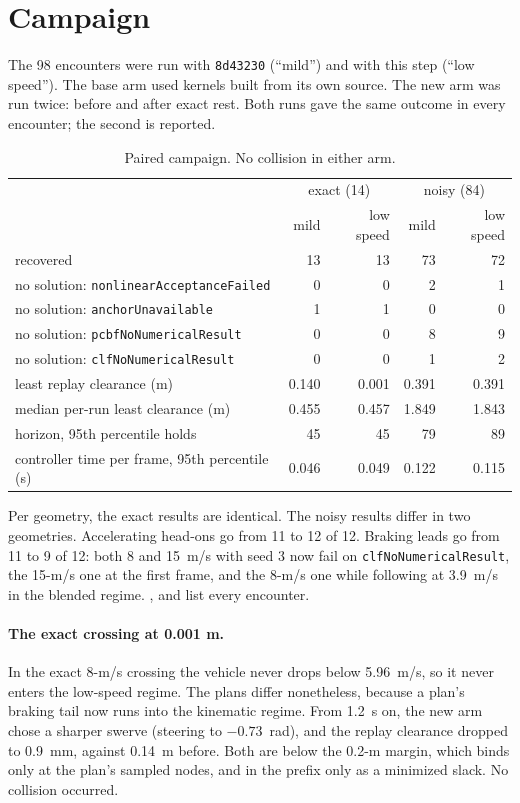 \documentclass[11pt]{article}
\begin{document}
\section{Campaign}
The 98 encounters were run with \texttt{8d43230} (``mild'') and with this
step (``low speed''). The base arm used kernels built from its own source.
The new arm was run twice: before and after exact rest. Both runs gave the
same outcome in every encounter; the second is reported.

\begin{table}[h]
\centering\small
\caption{Paired campaign. No collision in either arm.}
\begin{tabular}{lrrrr}
\toprule
 & \multicolumn{2}{c}{exact (14)} & \multicolumn{2}{c}{noisy (84)}\\
 & mild & low speed & mild & low speed\\
\midrule
recovered & 13 & 13 & 73 & 72\\
no solution: \texttt{nonlinearAcceptanceFailed} & 0 & 0 & 2 & 1\\
no solution: \texttt{anchorUnavailable} & 1 & 1 & 0 & 0\\
no solution: \texttt{pcbfNoNumericalResult} & 0 & 0 & 8 & 9\\
no solution: \texttt{clfNoNumericalResult} & 0 & 0 & 1 & 2\\
least replay clearance (m) & 0.140 & 0.001 & 0.391 & 0.391\\
median per-run least clearance (m) & 0.455 & 0.457 & 1.849 & 1.843\\
horizon, 95th percentile holds & 45 & 45 & 79 & 89\\
controller time per frame, 95th percentile (s) & 0.046 & 0.049 & 0.122 & 0.115\\
\bottomrule
\end{tabular}
\end{table}

Per geometry, the exact results are identical. The noisy results differ in
two geometries. Accelerating head-ons go from 11 to 12 of 12. Braking leads
go from 11 to 9 of 12: both 8 and 15~m/s with seed 3 now fail on
\texttt{clfNoNumericalResult}, the 15-m/s one at the first frame, and the
8-m/s one while following at 3.9~m/s in the blended regime.
,  and  list
every encounter.

\paragraph{The exact crossing at 0.001 m.}
In the exact 8-m/s crossing the vehicle never drops below 5.96~m/s, so it
never enters the low-speed regime. The plans differ nonetheless, because a
plan's braking tail now runs into the kinematic regime. From 1.2~s on, the
new arm chose a sharper swerve (steering to $-0.73$~rad), and the replay
clearance dropped to 0.9~mm, against 0.14~m before. Both are below the
0.2-m margin, which binds only at the plan's sampled nodes, and in the prefix
only as a minimized slack. No collision occurred.
\end{document}
